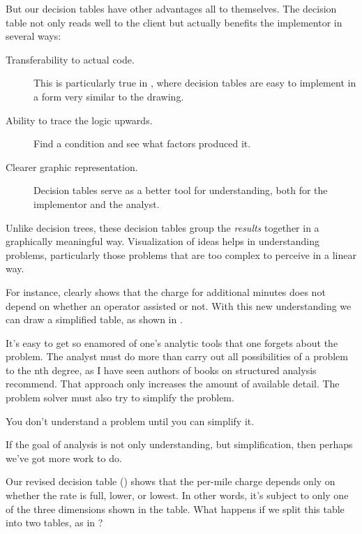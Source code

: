 But our decision tables have other advantages all to themselves.  The
decision table not only reads well to the client but actually benefits
the implementor in several ways:

\begin{description}
\item[Transferability to actual code.] This is particularly true in
\Forth{}, where decision tables are easy to implement in a form very
similar to the drawing.

\item[Ability to trace the logic upwards.] Find a condition and see what
factors produced it.

\item[Clearer graphic representation.] Decision tables serve as a better tool
for understanding, both for the implementor and the analyst.
\end{description}

Unlike decision trees, these decision tables group the \emph{results}
together in a graphically meaningful way. Visualization of ideas helps in
understanding problems, particularly those problems that are too
complex to perceive in a linear way.

For instance,  clearly shows that the charge for
additional minutes does not depend on whether an operator assisted or not.
With this new understanding we can draw a simplified table, as shown
in .



It's easy to get so enamored of one's analytic tools that one forgets
about the problem. The analyst must do more than carry out all
possibilities of a problem to the nth degree, as I have seen authors
of books on structured analysis recommend. That approach only
increases the amount of available detail. The problem solver must also
try to simplify the problem.

\begin{tip}
You don't understand a problem until you can simplify it.
\end{tip}
If the goal of analysis is not only understanding, but simplification, then
perhaps we've got more work to do.

Our revised decision table () shows that the per-mile
charge depends only on whether the rate is full, lower, or lowest. In
other words, it's subject to only one of the three dimensions shown in
the table.  What happens if we split this table into two tables, as in
?

